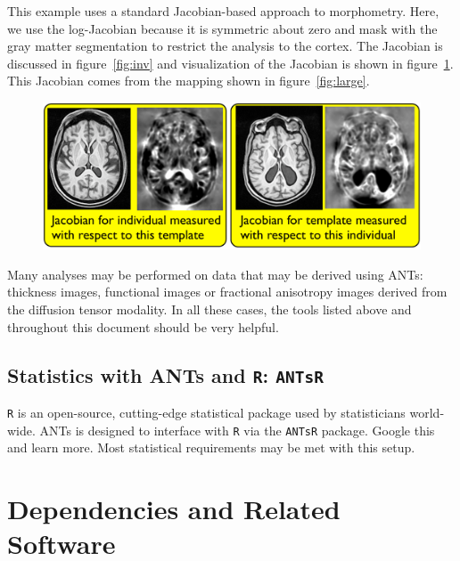 \documentclass{InsightArticle}
\begin{document}
This example uses a standard Jacobian-based approach to morphometry.
Here, we use the log-Jacobian because it is symmetric about zero and
mask with the gray matter segmentation to restrict the analysis to the
cortex.  The Jacobian is discussed in figure~\ref{fig:inv} and visualization of
the Jacobian is shown in figure~\ref{fig:jac}.  This Jacobian comes
from the mapping shown in figure~\ref{fig:large}.
\begin{figure}
\includegraphics[width=1\textwidth]{Figures/Jacobian.pdf}
\label{fig:jac}
\end{figure}
Many analyses may be performed on data that may be derived using ANTs:
thickness images, functional images or fractional anisotropy images derived from the diffusion 
tensor modality.  In all these cases, the tools listed above and
throughout this document should be very helpful.

\subsection{Statistics with ANTs and \texttt{R}: \texttt{ANTsR} }
\texttt{R} is an open-source, cutting-edge statistical package 
used by statisticians world-wide.   ANTs is designed to 
interface with \texttt{R} via the \texttt{ANTsR} package.  Google
this and learn more. Most statistical requirements may be met with this setup. 
\newpage
\section{Dependencies and Related Software}
\end{document}
